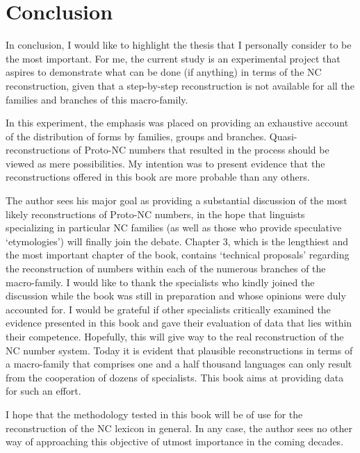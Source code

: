\clearpage
\section{Conclusion}
In conclusion, I would like to highlight the thesis that I personally consider to be the most important. For me, the current study is an experimental project that aspires to demonstrate what can be done (if anything) in terms of the NC reconstruction, given that a step-by-step reconstruction is not available for all the families and branches of this macro-family.

In this experiment, the emphasis was placed on providing an exhaustive account of the distribution of forms by families, groups and branches. Quasi-reconstructions of Proto-NC numbers that resulted in the process should be viewed as mere possibilities. My intention was to present evidence that the reconstructions offered in this book are more probable than any others. 

The author sees his major goal as providing a substantial discussion of the most likely reconstructions of Proto-NC numbers, in the hope that linguists specializing in particular NC families (as well as those who provide speculative ‘etymologies’) will finally join the debate. Chapter 3, which is the lengthiest and the most important chapter of the book, contains ‘technical proposals’ regarding the reconstruction of numbers within each of the numerous branches of the macro-family. I would like to thank the specialists who kindly joined the discussion while the book was still in preparation and whose opinions were duly accounted for. I would be grateful if other specialists critically examined the evidence presented in this book and gave their evaluation of data that lies within their competence. Hopefully, this will give way to the real reconstruction of the NC number system. Today it is evident that plausible reconstructions in terms of a macro-family that comprises one and a half thousand languages can only result from the cooperation of dozens of specialists. This book aims at providing data for such an effort.  

I hope that the methodology tested in this book will be of use for the reconstruction of the NC lexicon in general. In any case, the author sees no other way of approaching this objective of utmost importance in the coming decades.

